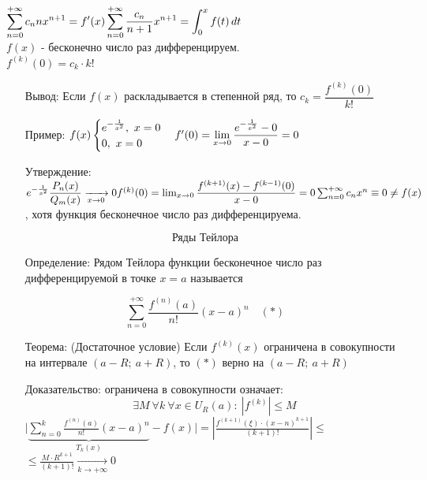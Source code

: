 \documentclass[12pt, letterpaper, twoside]{article}
\newcommand{\DS}{\displaystyle}
\newcommand{\oo}{\infty}
\newcommand{\Abs}[1]{\left| #1 \right|}
\begin{document}
    $\DS \sum_{n = 0}^{+\oo}c_n n x^{n + 1} = f'(x)\\
    \sum_{n = 0}^{+\oo} \frac{c_n}{n + 1} x^{n + 1} = \int_0^x f(t)\, dt$\\
    $f(x)$ - бесконечно число раз дифференцируем.\\
    $f^{(k)}(0) = c_k\cdot k!$
    \begin{enumerate}
        \item[Вывод:] Если $f(x)$ раскладывается в степенной ряд, то $c_k = \dfrac{f^{(k)}(0)}{k!}$
        \item[Пример:] $f(x) \begin{cases}
            e^{-\frac{1}{x^2}},\ x = 0\\
            0,\ x = 0
        \end{cases}\\
        f'(0) = \DS \lim_{x \rightarrow 0} \frac{e^{-\frac{1}{x^2}} - 0}{x - 0} = 0$
        \item[Утверждение:] $e^{-\frac{1}{x^2}} \dfrac{P_n(x)}{Q_m(x)}\xrightarrow[x\rightarrow 0]{} 0\\
        f^{(k)}(0) = \lim_{x\rightarrow  0} \dfrac{f^{(k + 1)}(x) - f^{(k - 1)}(0)}{x - 0} = 0\\
        \sum_{n = 0}^{+\oo} c_n x^n \equiv 0 \neq f(x)$, хотя функция бесконечное число раз дифференцируема. 
    \end{enumerate}
    \[\text{Ряды Тейлора}\]
    \begin{enumerate}
        \item[Определение:] Рядом Тейлора функции бесконечное число раз дифференцируемой в точке $x = a$ называется
    \end{enumerate}
    \[\sum_{n = 0}^{+\oo} \frac{f^{(n)}(a)}{n!}(x - a)^n\quad (*)\]
    \begin{enumerate}
        \item[Теорема:] (Достаточное условие) Если $f^{(k)}(x)$ ограничена в совокупности на интервале $(a - R;\ a + R)$, то $(*)$ верно на $(a - R;\ a + R)$
        \item[Доказательство:] ограничена в совокупности означает: 
        \[\exists M\ \forall k\ \forall x\in U_R(a):\ \Abs{f^{(k)}} \leq M\]
        $\DS \Bigg|{\underset{T_k(x)}{\underbrace{\sum_{n = 0}^{k} \frac{f^{(n)}(a)}{n!}(x - a)^n}} - f(x) }\Bigg| = \Abs{ \frac{f^{(k + 1)}(\xi)\cdot (x - n)^{k + 1}}{(k + 1)!} } \leq$\\
        $\leq \frac{M\cdot R^{k + 1}}{(k + 1)!}\xrightarrow[k\rightarrow +\oo]{}0$ 
    \end{enumerate}
\end{document}
